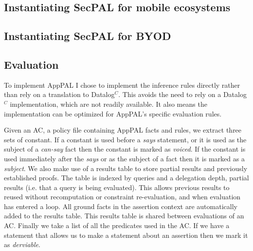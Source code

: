 \documentclass[thesis.tex]{subfiles}
\begin{document}
\subsection{Instantiating SecPAL for mobile ecosystems}
\label{ssec:instantiating}

\subsection{Instantiating SecPAL for BYOD}

\subsection{Evaluation}
\label{ssec:evaluation-alg}

To implement AppPAL I chose to implement the inference rules directly rather than rely on a translation to Datalog$^C$.
This avoids the need to rely on a Datalog$^C$ implementation, which are not readily available.
It also means the implementation can be optimized for AppPAL's specific evaluation rules.

Given an \ac{AC}, a policy file containing AppPAL facts and rules, we extract three sets of constant.
If a constant is used before a \emph{says} statement, or it is used as the subject of a \emph{can-say} fact then the constant is marked as \emph{voiced}.  
If the constant is used immediately after the \emph{says} or as the subject of a fact then it is marked as a \emph{subject}.
We also make use of a results table to store partial results and previously established proofs.
The table is indexed by queries and a delegation depth, partial results (i.e. that a query is being evaluated).
This allows previous results to reused without recomputation or constraint re-evaluation, and when evaluation has entered a loop.
All ground facts in the assertion context are automatically added to the results table.
This results table is shared between evaluations of an \ac{AC}.
Finally we take a list of all the predicates used in the \ac{AC}.
If we have a statement that allows us to make a statement about an assertion then we mark it as \emph{derviable}.
\end{document}
